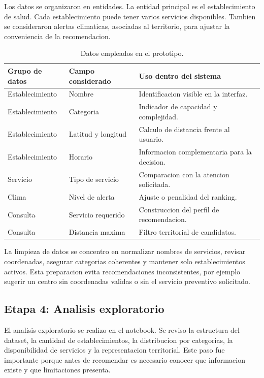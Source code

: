 \documentclass[12pt,a4paper]{article}
\begin{document}
Los datos se organizaron en entidades. La entidad principal es el establecimiento de salud. Cada establecimiento puede tener varios servicios disponibles. Tambien se consideraron alertas climaticas, asociadas al territorio, para ajustar la conveniencia de la recomendacion.

\begin{table}[H]
\centering
\caption{Datos empleados en el prototipo.}
\label{tab:datos}
\small
\begin{tabular}{p{3.3cm}p{3.8cm}p{5.4cm}}
\toprule
Grupo de datos & Campo considerado & Uso dentro del sistema \\
\midrule
Establecimiento & Nombre & Identificacion visible en la interfaz. \\
Establecimiento & Categoria & Indicador de capacidad y complejidad. \\
Establecimiento & Latitud y longitud & Calculo de distancia frente al usuario. \\
Establecimiento & Horario & Informacion complementaria para la decision. \\
Servicio & Tipo de servicio & Comparacion con la atencion solicitada. \\
Clima & Nivel de alerta & Ajuste o penalidad del ranking. \\
Consulta & Servicio requerido & Construccion del perfil de recomendacion. \\
Consulta & Distancia maxima & Filtro territorial de candidatos. \\
\bottomrule
\end{tabular}
\end{table}

La limpieza de datos se concentro en normalizar nombres de servicios, revisar coordenadas, asegurar categorias coherentes y mantener solo establecimientos activos. Esta preparacion evita recomendaciones inconsistentes, por ejemplo sugerir un centro sin coordenadas validas o sin el servicio preventivo solicitado.

\subsection{Etapa 4: Analisis exploratorio}
El analisis exploratorio se realizo en el notebook. Se reviso la estructura del dataset, la cantidad de establecimientos, la distribucion por categorias, la disponibilidad de servicios y la representacion territorial. Este paso fue importante porque antes de recomendar es necesario conocer que informacion existe y que limitaciones presenta.
\end{document}
